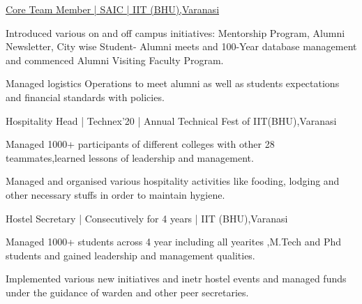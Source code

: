 
\begin{cventries}
  \cventry
    {} %
    {\href{https://alumni.iitbhu.ac.in/}{Core Team Member | SAIC | IIT (BHU),Varanasi} \hspace{0.3cm} }
    {} %
    {} %
    {
      \begin{cvitems} %
        \item {Introduced various on and off campus initiatives: Mentorship Program, Alumni Newsletter, City wise Student- Alumni meets and 100-Year database management and commenced Alumni Visiting Faculty Program.}
		\item {Managed logistics Operations to meet alumni as well as students expectations and financial standards with policies.}
      \end{cvitems}
    }

  \cventry
    {} %
    {Hospitality Head | Technex'20 | Annual Technical Fest of IIT(BHU),Varanasi
    \hspace{0.3cm} } %
    {} %
    {} %
    {
      \begin{cvitems} %
      	\item {Managed 1000+ participants of different colleges with other 28 teammates,learned lessons of leadership and management. }
		\item {Managed and organised various hospitality activities like fooding, lodging and other necessary stuffs in order to maintain hygiene.}
      \end{cvitems}
    }
    
    \cventry
    {} %
    {Hostel Secretary | Consecutively for 4 years | IIT (BHU),Varanasi
    \hspace{0.3cm} } %
    {} %
    {} %
    {
      \begin{cvitems} %
      	\item {Managed 1000+ students across 4 year including all yearites ,M.Tech and Phd students and gained leadership and management qualities. }
		\item {Implemented various new initiatives and inetr hostel events and managed funds under the guidance of warden and other peer secretaries.}
      \end{cvitems}
    }    
\end{cventries}